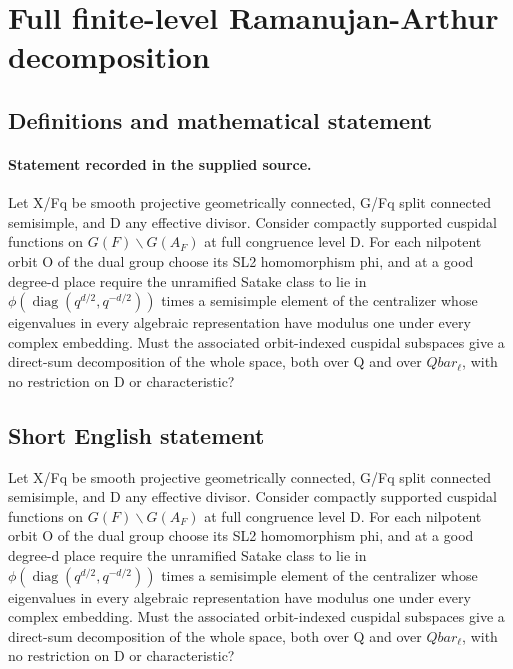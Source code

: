 \documentclass[11pt]{article}
\begin{document}
\section*{Full finite-level Ramanujan-Arthur decomposition}\label{statement}
\subsection{Definitions and mathematical statement}
\paragraph{Statement recorded in the supplied source.}
Let X/Fq be smooth projective geometrically connected, G/Fq split connected semisimple, and D any effective divisor. Consider compactly supported cuspidal functions on $G(F)\backslash G(A_F)$ at full congruence level D. For each nilpotent orbit O of the dual group choose its SL2 homomorphism phi, and at a good degree-d place require the unramified Satake class to lie in $\phi (\operatorname{diag}(q^{d/2},q^{-d/2}))$ times a semisimple element of the centralizer whose eigenvalues in every algebraic representation have modulus one under every complex embedding. Must the associated orbit-indexed cuspidal subspaces give a direct-sum decomposition of the whole space, both over Q and over $Qbar_\ell $, with no restriction on D or characteristic?
\subsection{Short English statement}
Let X/Fq be smooth projective geometrically connected, G/Fq split connected semisimple, and D any effective divisor. Consider compactly supported cuspidal functions on $G(F)\backslash G(A_F)$ at full congruence level D. For each nilpotent orbit O of the dual group choose its SL2 homomorphism phi, and at a good degree-d place require the unramified Satake class to lie in $\phi (\operatorname{diag}(q^{d/2},q^{-d/2}))$ times a semisimple element of the centralizer whose eigenvalues in every algebraic representation have modulus one under every complex embedding. Must the associated orbit-indexed cuspidal subspaces give a direct-sum decomposition of the whole space, both over Q and over $Qbar_\ell $, with no restriction on D or characteristic?
\end{document}
